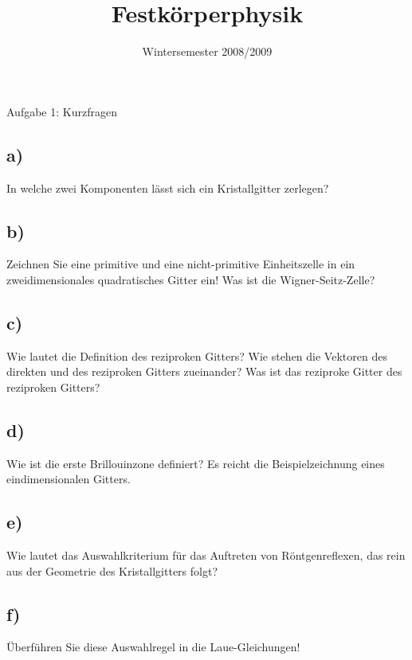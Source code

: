 

\subject{FKP}
\title{Festkörperphysik}
\date{
    Wintersemester 2008/2009
}



\maketitle
\thispagestyle{empty}
\newpage


\begin{aufgabe}{Aufgabe 1: Kurzfragen}
    \subsection{a)}
    In welche zwei Komponenten lässt sich ein Kristallgitter zerlegen?

    \subsection{b)}
    Zeichnen Sie eine primitive und eine nicht-primitive Einheitszelle in ein zweidimensionales quadratisches Gitter ein!
    Was ist die Wigner-Seitz-Zelle?

    \subsection{c)}
    Wie lautet die Definition des reziproken Gitters?
    Wie stehen die Vektoren des direkten und des reziproken Gitters zueinander?
    Was ist das reziproke Gitter des reziproken Gitters?

    \subsection{d)}
    Wie ist die erste Brillouinzone definiert?
    Es reicht die Beispielzeichnung eines eindimensionalen Gitters.

    \subsection{e)}
    Wie lautet das Auswahlkriterium für das Auftreten von Röntgenreflexen,
    das rein aus der Geometrie des Kristallgitters folgt?

    \subsection{f)}
    Überführen Sie diese Auswahlregel in die Laue-Gleichungen!


\end{aufgabe}
